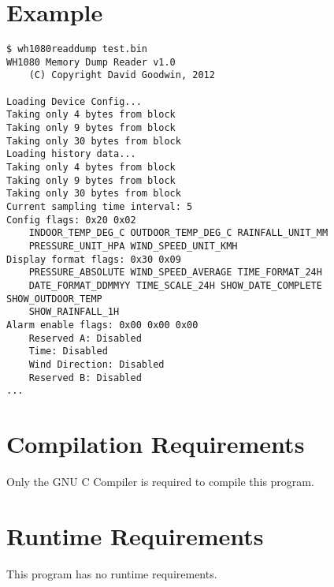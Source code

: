 \documentclass[a4paper,10pt,draft]{book}
\newcommand{\partnumber}{\ifthenelse{\isundefined{\projectnum}}{}{\projectnum-\docnum	\ifthenelse{\equal{\docrev}{001}}{}{.\docrev}}}
\newcommand*\cleartoleftpage{%
  \clearpage
  \ifodd\value{page}\hbox{}\newpage\fi
}
\begin{document}
\section{Example}
\begin{verbatim}
$ wh1080readdump test.bin
WH1080 Memory Dump Reader v1.0
	(C) Copyright David Goodwin, 2012

Loading Device Config...
Taking only 4 bytes from block
Taking only 9 bytes from block
Taking only 30 bytes from block
Loading history data...
Taking only 4 bytes from block
Taking only 9 bytes from block
Taking only 30 bytes from block
Current sampling time interval: 5
Config flags: 0x20 0x02
	INDOOR_TEMP_DEG_C OUTDOOR_TEMP_DEG_C RAINFALL_UNIT_MM 
	PRESSURE_UNIT_HPA WIND_SPEED_UNIT_KMH 
Display format flags: 0x30 0x09
	PRESSURE_ABSOLUTE WIND_SPEED_AVERAGE TIME_FORMAT_24H 
	DATE_FORMAT_DDMMYY TIME_SCALE_24H SHOW_DATE_COMPLETE SHOW_OUTDOOR_TEMP 
	SHOW_RAINFALL_1H 
Alarm enable flags: 0x00 0x00 0x00
	Reserved A: Disabled
	Time: Disabled
	Wind Direction: Disabled
	Reserved B: Disabled
...
\end{verbatim}

\section{Compilation Requirements}
Only the GNU C Compiler is required to compile this program.

\section{Runtime Requirements}
This program has no runtime requirements.


\cleartoleftpage
\thispagestyle{empty}
\begin{flushright}
\null
\vfill
\tt \partnumber
\end{flushright}
\end{document}
